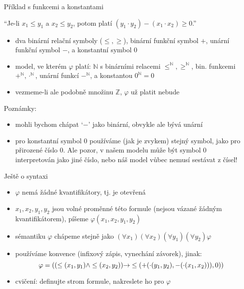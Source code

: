\documentclass{beamer}
\begin{document}
\begin{frame}{Příklad s funkcemi a konstantami}

    ``Je-li $x_1\leq y_1$ a $x_2\leq y_2$, potom platí $(y_1 \cdot y_2)-(x_1\cdot x_2)\geq 0$.''


    \begin{itemize}
        \item dva binární relační symboly ($\leq,\geq$), binární funkční symbol $+$, unární funkční symbol $-$, a konstantní symbol $0$
        \item \alert{model, ve kterém $\varphi$ platí:} $\mathbb N$ s binárními relacemi $\leq^\mathbb N,\geq^\mathbb N$, bin. funkcemi $+^\mathbb N,\cdot^\mathbb N$, unární funkcí $-^\mathbb N$, a konstantou $0^\mathbb N=0$ 
        \item vezmeme-li ale podobně množinu $\mathbb Z$, $\varphi$ už platit nebude
    \end{itemize}
    Poznámky:
    \begin{itemize}
        \item mohli bychom chápat `$-$' jako binární, obvykle ale bývá unární
        \item pro \alert{konstantní symbol} $0$ používáme (jak je zvykem) stejný symbol, jako pro přirozené číslo 0. Ale pozor, v našem modelu může být \alert{symbol} $0$ interpretován jako \alert{jiné číslo}, nebo náš model vůbec nemusí sestávat z čísel!
    \end{itemize}

\end{frame}


\begin{frame}{Ještě o syntaxi}


    \begin{itemize}
        \item $\varphi$ nemá žádné kvantifikátory, tj. je \alert{otevřená}
        \item $x_1,x_2,y_1,y_2$ jsou \alert{volné proměnné} této formule (nejsou \alert{vázané} žádným kvantifikátorem), píšeme $\varphi(x_1,x_2,y_1,y_2)$
        \item sémantiku $\varphi$ chápeme stejně jako $(\forall x_1)(\forall x_2)(\forall y_1)(\forall y_2)\varphi$
        \item používáme \alert{konvence} (infixový zápis, vynechání závorek), jinak:
        $$
        \varphi=((\leq (x_1,y_1) \land \leq(x_2,y_2))\mathbin{\rightarrow} \leq(+(\cdot (y_1,y_2),-(\cdot(x_1,x_2))),0))
        $$
        \item cvičení: definujte \alert{strom formule}, nakreslete ho pro $\varphi$
    \end{itemize}
   
\end{frame}
\end{document}
